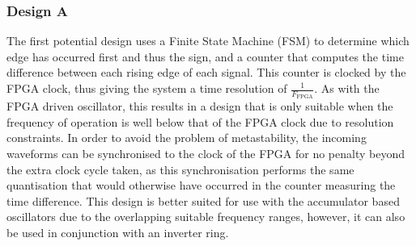 \documentclass[conference]{IEEEtran}
\begin{document}
\subsubsection*{Design A}
The first potential design uses a Finite State Machine (FSM) to determine which edge has occurred first and thus the sign, and a counter that computes the time difference between each rising edge of each signal. This counter is clocked by the FPGA clock, thus giving the system a time resolution of $\frac{1}{F_{\textrm{FPGA}}}$. As with the FPGA driven oscillator, this results in a design that is only suitable when the frequency of operation is well below that of the FPGA clock due to resolution constraints. In order to avoid the problem of metastability, the incoming waveforms can be synchronised to the clock of the FPGA for no penalty beyond the extra clock cycle taken, as this synchronisation performs the same quantisation that would otherwise have occurred in the counter measuring the time difference. This design is better suited for use with the accumulator based oscillators due to the overlapping suitable frequency ranges, however, it can also be used in conjunction with an inverter ring. 
\end{document}
